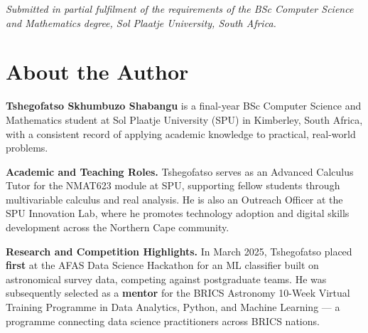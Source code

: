 \documentclass[12pt, a4paper]{article}
\begin{document}
\begin{titlepage}
    \begin{abstract}
        \noindent
        This report documents an end-to-end fraud detection pipeline built on the
        IEEE-CIS Fraud Detection dataset, comprising 590,540 real-world financial
        transactions with a 3.5\% fraud prevalence rate. The pipeline spans a
        four-schema PostgreSQL architecture, a reproducible \texttt{tidymodels} R
        workflow with SMOTE oversampling, and an interactive Shiny dashboard. Three
        classification models were trained and evaluated: Logistic Regression,
        Random Forest, and XGBoost. The Random Forest model achieved the best
        performance, with a PR-AUC of 0.679 and ROC-AUC of 0.927. Threshold tuning
        at $\tau = 0.25$ improved fraud recall from 47.9\% to 66.3\% at a precision
        of 58.3\%. The entire pipeline was built and run on a Ryzen 5 laptop with
        16 GB of RAM --- a deliberate resource constraint that shaped several design
        decisions documented throughout this report.
    \end{abstract}

    \vfill
    {\small \textit{Submitted in partial fulfilment of the requirements of the
    BSc Computer Science and Mathematics degree, Sol Plaatje University,
    South Africa.}}
\end{titlepage}

\newpage
\section*{About the Author}

\textbf{Tshegofatso Skhumbuzo Shabangu} is a final-year BSc Computer Science and
Mathematics student at Sol Plaatje University (SPU) in Kimberley, South Africa,
with a consistent record of applying academic knowledge to practical, real-world
problems.

\medskip
\noindent\textbf{Academic and Teaching Roles.}
Tshegofatso serves as an Advanced Calculus Tutor for the NMAT623 module at SPU,
supporting fellow students through multivariable calculus and real analysis. He is
also an Outreach Officer at the SPU Innovation Lab, where he promotes technology
adoption and digital skills development across the Northern Cape community.

\medskip
\noindent\textbf{Research and Competition Highlights.}
In March 2025, Tshegofatso placed \textbf{first} at the AFAS Data Science Hackathon
for an ML classifier built on astronomical survey data, competing against
postgraduate teams. He was subsequently selected as a \textbf{mentor} for the BRICS
Astronomy 10-Week Virtual Training Programme in Data Analytics, Python, and Machine
Learning --- a programme connecting data science practitioners across BRICS nations.
\end{document}
